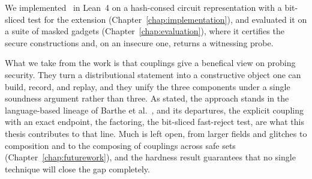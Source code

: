 We implemented \toolname\ in Lean~4 on a hash-consed circuit representation with a
bit-sliced test for the extension (Chapter~\ref{chap:implementation}), and
evaluated it on a suite of masked gadgets (Chapter~\ref{chap:evaluation}), where it
certifies the secure constructions and, on an insecure one, returns a witnessing
probe.

What we take from the work is that couplings give a benefical view on probing
security. They turn a distributional statement into a constructive object one can
build, record, and replay, and they unify the three components under a single
soundness argument rather than three. As stated, the approach stands in the language-based
lineage of Barthe et al.\ \parencite{barthe2015verified,
10.1007/978-3-030-29959-0_15}, and its departures, the explicit coupling with an
exact endpoint, the factoring, the bit-sliced fast-reject test, are what this thesis
contributes to that line. Much
is left open, from larger fields and glitches to composition and to the composing of
couplings across safe sets (Chapter~\ref{chap:futurework}), and the hardness result
guarantees that no single technique will close the gap completely.
